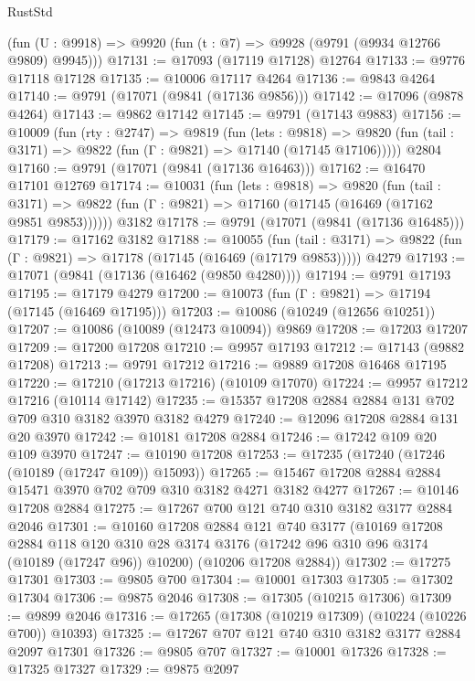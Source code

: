 \begin{lexlean}{RustStd}
\begin{coremodule}
    (fun (U : @9918) => @9920 (fun (t : @7) => @9928 (@9791 (@9934 @12766 @9809) @9945)))
@17131 := @17093 (@17119 @17128) @12764
@17133 := @9776 @17118 @17128
@17135 := @10006 @17117 @4264
@17136 := @9843 @4264
@17140 := @9791 (@17071 (@9841 (@17136 @9856)))
@17142 := @17096 (@9878 @4264)
@17143 := @9862 @17142
@17145 := @9791 (@17143 @9883)
@17156 := @10009
    (fun (rty : @2747) =>
    @9819
      (fun (lets : @9818) =>
      @9820 (fun (tail : @3171) => @9822 (fun (Γ : @9821) => @17140 (@17145 @17106)))))
    @2804
@17160 := @9791 (@17071 (@9841 (@17136 @16463)))
@17162 := @16470 @17101 @12769
@17174 := @10031
    (fun (lets : @9818) =>
    @9820
      (fun (tail : @3171) =>
      @9822 (fun (Γ : @9821) => @17160 (@17145 (@16469 (@17162 @9851 @9853))))))
    @3182
@17178 := @9791 (@17071 (@9841 (@17136 @16485)))
@17179 := @17162 @3182
@17188 := @10055
    (fun (tail : @3171) => @9822 (fun (Γ : @9821) => @17178 (@17145 (@16469 (@17179 @9853)))))
    @4279
@17193 := @17071 (@9841 (@17136 (@16462 (@9850 @4280))))
@17194 := @9791 @17193
@17195 := @17179 @4279
@17200 := @10073 (fun (Γ : @9821) => @17194 (@17145 (@16469 @17195)))
@17203 := @10086 (@10249 (@12656 @10251))
@17207 := @10086 (@10089 (@12473 @10094)) @9869
@17208 := @17203 @17207
@17209 := @17200 @17208
@17210 := @9957 @17193
@17212 := @17143 (@9882 @17208)
@17213 := @9791 @17212
@17216 := @9889 @17208 @16468 @17195
@17220 := @17210 (@17213 @17216) (@10109 @17070)
@17224 := @9957 @17212 @17216 (@10114 @17142)
@17235 := @15357 @17208 @2884 @2884 @131 @702 @709 @310 @3182 @3970 @3182 @4279
@17240 := @12096 @17208 @2884 @131 @20 @3970
@17242 := @10181 @17208 @2884
@17246 := @17242 @109 @20 @109 @3970
@17247 := @10190 @17208
@17253 := @17235 (@17240 (@17246 (@10189 (@17247 @109)) @15093))
@17265 := @15467 @17208 @2884 @2884 @15471 @3970 @702 @709 @310 @3182 @4271 @3182 @4277
@17267 := @10146 @17208 @2884
@17275 := @17267 @700 @121 @740 @310 @3182 @3177 @2884 @2046
@17301 := @10160
    @17208
    @2884
    @121
    @740
    @3177
    (@10169
      @17208
      @2884
      @118
      @120
      @310
      @28
      @3174
      @3176
      (@17242 @96 @310 @96 @3174 (@10189 (@17247 @96)) @10200)
      (@10206 @17208 @2884))
@17302 := @17275 @17301
@17303 := @9805 @700
@17304 := @10001 @17303
@17305 := @17302 @17304
@17306 := @9875 @2046
@17308 := @17305 (@10215 @17306)
@17309 := @9899 @2046
@17316 := @17265 (@17308 (@10219 @17309) (@10224 (@10226 @700)) @10393)
@17325 := @17267 @707 @121 @740 @310 @3182 @3177 @2884 @2097 @17301
@17326 := @9805 @707
@17327 := @10001 @17326
@17328 := @17325 @17327
@17329 := @9875 @2097

\end{coremodule}
\end{lexlean}
